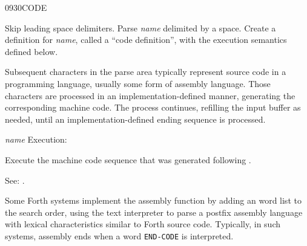 \begin{newword}{0930}{CODE}

	Skip leading space delimiters. Parse \emph{name} delimited by a
	space. Create a definition for \emph{name}, called a ``code
	definition'', with the execution semantics defined below.

	Subsequent characters in the parse area typically represent
	source code in a programming language, usually some form of
	assembly language. Those characters are processed in an
	implementation-defined manner, generating the corresponding
	machine code. The process continues, refilling the input buffer
	as needed, until an implementation-defined ending sequence is
	processed.

\item[\emph{name} Execution:]

	Execute the machine code sequence that was generated following
	.

\item[See:]
	.

	\begin{rationale} %
		Some Forth systems implement the assembly function by adding
		an  word list to the search order,
		using the text interpreter to parse a postfix assembly
		language with lexical characteristics similar to Forth source
		code. Typically, in such systems, assembly ends when a word
		\texttt{END-CODE} is interpreted.
	\end{rationale}
\end{newword}


